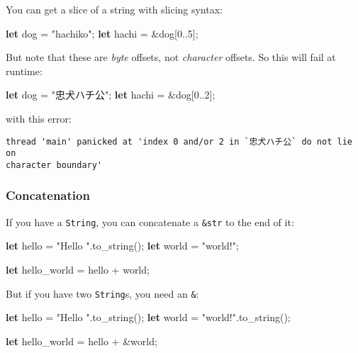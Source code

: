 \documentclass[a4paper,]{book}
\newenvironment{Shaded}{\begin{snugshade}}{\end{snugshade}}
\newcommand{\KeywordTok}[1]{\textcolor[rgb]{0.13,0.29,0.53}{\textbf{{#1}}}}
\newcommand{\DecValTok}[1]{\textcolor[rgb]{0.00,0.00,0.81}{{#1}}}
\newcommand{\StringTok}[1]{\textcolor[rgb]{0.31,0.60,0.02}{{#1}}}
\newcommand{\NormalTok}[1]{{#1}}
\begin{document}
You can get a slice of a string with slicing syntax:

\begin{Shaded}
\begin{Highlighting}[]
\KeywordTok{let} \NormalTok{dog = }\StringTok{"hachiko"}\NormalTok{;}
\KeywordTok{let} \NormalTok{hachi = &dog[}\DecValTok{0.}\NormalTok{.}\DecValTok{5}\NormalTok{];}
\end{Highlighting}
\end{Shaded}

But note that these are \emph{byte} offsets, not \emph{character}
offsets. So this will fail at runtime:

\begin{Shaded}
\begin{Highlighting}[]
\KeywordTok{let} \NormalTok{dog = }\StringTok{"忠犬ハチ公"}\NormalTok{;}
\KeywordTok{let} \NormalTok{hachi = &dog[}\DecValTok{0.}\NormalTok{.}\DecValTok{2}\NormalTok{];}
\end{Highlighting}
\end{Shaded}

with this error:

\begin{verbatim}
thread 'main' panicked at 'index 0 and/or 2 in `忠犬ハチ公` do not lie on
character boundary'
\end{verbatim}

\subsubsection{Concatenation}\label{concatenation}

If you have a \texttt{String}, you can concatenate a \texttt{\&str} to
the end of it:

\begin{Shaded}
\begin{Highlighting}[]
\KeywordTok{let} \NormalTok{hello = }\StringTok{"Hello "}\NormalTok{.to_string();}
\KeywordTok{let} \NormalTok{world = }\StringTok{"world!"}\NormalTok{;}

\KeywordTok{let} \NormalTok{hello_world = hello + world;}
\end{Highlighting}
\end{Shaded}

But if you have two \texttt{String}s, you need an \texttt{\&}:

\begin{Shaded}
\begin{Highlighting}[]
\KeywordTok{let} \NormalTok{hello = }\StringTok{"Hello "}\NormalTok{.to_string();}
\KeywordTok{let} \NormalTok{world = }\StringTok{"world!"}\NormalTok{.to_string();}

\KeywordTok{let} \NormalTok{hello_world = hello + &world;}
\end{Highlighting}
\end{Shaded}
\end{document}
